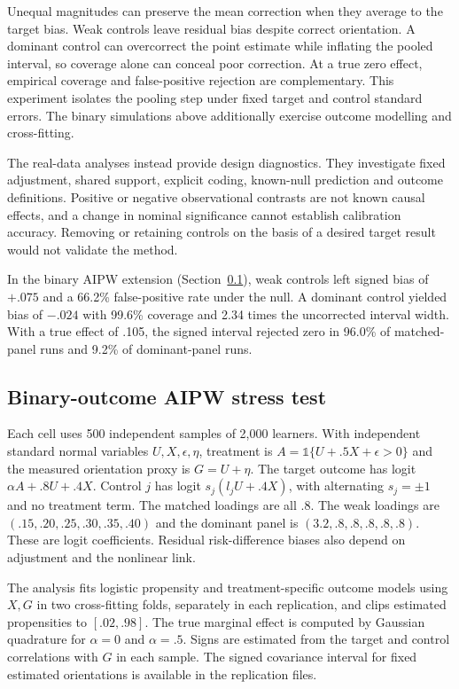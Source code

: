 
Unequal magnitudes can preserve the mean correction when they average to the target bias. Weak controls leave residual bias despite correct orientation. A dominant control can overcorrect the point estimate while inflating the pooled interval, so coverage alone can conceal poor correction. At a true zero effect, empirical coverage and false-positive rejection are complementary. This experiment isolates the pooling step under fixed target and control standard errors. The binary simulations above additionally exercise outcome modelling and cross-fitting.


The real-data analyses instead provide design diagnostics. They investigate fixed adjustment, shared support, explicit coding, known-null prediction and outcome definitions. Positive or negative observational contrasts are not known causal effects, and a change in nominal significance cannot establish calibration accuracy. Removing or retaining controls on the basis of a desired target result would not validate the method.

In the binary AIPW extension (Section~\ref{sec:binary-stress}), weak controls left signed bias of $+.075$ and a 66.2\% false-positive rate under the null. A dominant control yielded bias of $-.024$ with 99.6\% coverage and 2.34 times the uncorrected interval width. With a true effect of .105, the signed interval rejected zero in 96.0\% of matched-panel runs and 9.2\% of dominant-panel runs.

\subsection{Binary-outcome AIPW stress test}
\label{sec:binary-stress}

Each cell uses 500 independent samples of 2,000 learners. With independent standard normal variables $U,X,\epsilon,\eta$, treatment is $A=\mathbb{1}\{U+.5X+\epsilon>0\}$ and the measured orientation proxy is $G=U+\eta$. The target outcome has logit $\alpha A+.8U+.4X$. Control $j$ has logit $s_j(l_j U+.4X)$, with alternating $s_j=\pm1$ and no treatment term. The matched loadings are all .8. The weak loadings are $(.15,.20,.25,.30,.35,.40)$ and the dominant panel is $(3.2,.8,.8,.8,.8,.8)$. These are logit coefficients. Residual risk-difference biases also depend on adjustment and the nonlinear link.

The analysis fits logistic propensity and treatment-specific outcome models using $X,G$ in two cross-fitting folds, separately in each replication, and clips estimated propensities to $[.02,.98]$. The true marginal effect is computed by Gaussian quadrature for $\alpha=0$ and $\alpha=.5$. Signs are estimated from the target and control correlations with $G$ in each sample. The signed covariance interval for fixed estimated orientations is available in the replication files.

